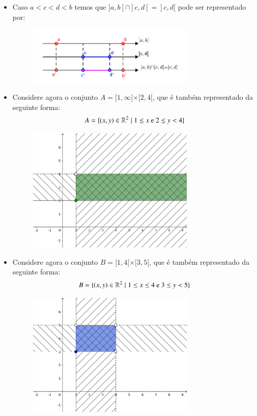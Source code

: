 \begin{itemize}
   \item Caso $a< c< d< b$ temos que $]a, b[ \cap ]c, d[= ]c, d[$ pode ser representado por:
  \begin{figure}[H]
 \centering
 \includegraphics[width=8cm]{Capitulos/Figuras/intersecaoa-c-db.pdf}
 \end{figure}

 \item Considere agora o conjunto $A= [1, \infty[ \times [2, 4[$, que é também representado da seguinte forma:
 \[A= \{(x, y) \in \mathbb{R}^2 \mid 1 \leq x \text{ e } 2 \leq y < 4 \}\]
   \begin{figure}[H]
 \centering
 \includegraphics[width=8cm]{Capitulos/Figuras/cartesiano1infty24.pdf}
 \end{figure}

 \item Considere agora o conjunto $B= [1, 4[ \times [3, 5[$, que é também representado da seguinte forma:
 \[B= \{(x, y) \in \mathbb{R}^2 \mid 1 \leq x \leq 4 \text{ e } 3 \leq y < 5 \}\]
   \begin{figure}[H]
 \centering
 \includegraphics[width=8cm]{Capitulos/Figuras/cartesiano1435.pdf}
 \end{figure}


\end{itemize}

